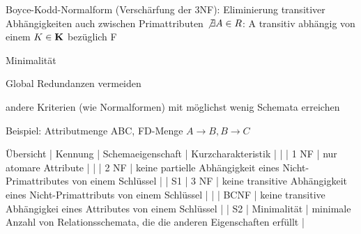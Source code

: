 \documentclass[a4paper]{article}
\begin{document}
\begin{multicols}{3}
Boyce-Kodd-Normalform (Verschärfung der 3NF): Eliminierung transitiver Abhängigkeiten auch zwischen Primattributen $\not\exists A \in R$: A transitiv abhängig von einem $K\in\bf{K}$ bezüglich F

Minimalität
\begin{itemize*}
    \item Global Redundanzen vermeiden
    \item andere Kriterien (wie Normalformen) mit möglichst wenig Schemata erreichen
    \item Beispiel: Attributmenge ABC, FD-Menge ${A \rightarrow B, B \rightarrow C}$
\end{itemize*}

Übersicht
| Kennung | Schemaeigenschaft | Kurzcharakteristik |
| | 1 NF | nur atomare Attribute |
| | 2 NF | keine partielle Abhängigkeit eines Nicht-Primattributes von einem Schlüssel |
| S1 | 3 NF | keine transitive Abhängigkeit eines Nicht-Primattributs von einem Schlüssel |
| | BCNF | keine transitive Abhängigkei eines Attributes von einem Schlüssel |
| S2 | Minimalität | minimale Anzahl von Relationsschemata, die die anderen Eigenschaften erfüllt |


\end{multicols}
\end{document}

